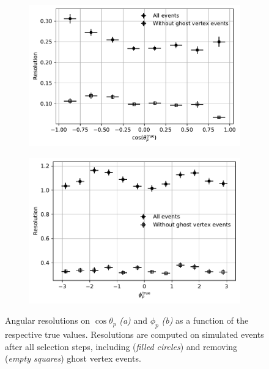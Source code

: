 \begin{figure}[t]
	\centering
	\begin{subfigure}{.45\textwidth}
		\includegraphics[width=\textwidth]{graphics/05-angular_distributions/MCRECO_p_theta_resolution_nocross.pdf}
		\caption{}
		\label{fig:4:theta_resolution_nocross}
	\end{subfigure}
	\begin{subfigure}{.45\textwidth}
		\includegraphics[width=\textwidth]{graphics/05-angular_distributions/MCRECO_p_phi_resolution_nocross.pdf}
		\caption{}
		\label{fig:5:phi_resolution_nocross}
	\end{subfigure}
	\caption{Angular resolutions on $\cos\theta_p$ \textit{(a)} and $\phi_p$ \textit{(b)} as a function of the respective true values. Resolutions are computed on simulated \demonstratorshort events after all selection steps, including (\textit{filled circles}) and removing (\textit{empty squares}) \lambdadecay ghost vertex events.}
	\label{fig:4:resolution_nocross}
\end{figure}
